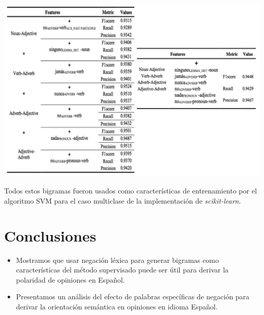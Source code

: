 \documentclass[a0,portrait]{a0poster}
\begin{document}
\begin{multicols}{2}
\begin{center}\vspace{0.5cm}
\includegraphics[width=1.0\linewidth]{tabla11.png}
\end{center}\vspace{0.5cm}

Todos estos bigramas fueron usados como características de entrenamiento por el algoritmo SVM para el caso multiclase de la implementación de \textit{scikit-learn}.




\color{SaddleBrown} %

\section*{Conclusiones}

\begin{itemize}
\item Mostramos que usar negación léxica para generar bigramas como características del método supervisado puede ser útil para derivar la polaridad de opiniones en Español.
\item Presentamos un análisis del efecto de palabras específicas de negación para derivar la orientación semántica en opiniones en idioma Español.
\end{itemize}


\end{multicols}
\end{document}
